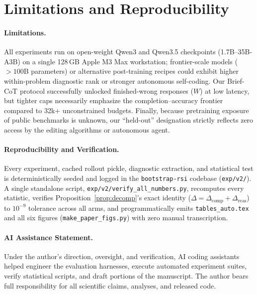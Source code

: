 \documentclass[10pt]{article}
\begin{document}
\section{Limitations and Reproducibility}
\label{sec:limitations}

\paragraph{Limitations.}
All experiments run on open-weight Qwen3 and Qwen3.5 checkpoints (1.7B--35B-A3B) on a single 128\,GB Apple M3 Max workstation; frontier-scale models ($>100$B parameters) or alternative post-training recipes could exhibit higher within-problem diagnostic rank or stronger autonomous self-coding. Our Brief-CoT protocol successfully unlocked finished-wrong responses ($W$) at low latency, but tighter caps necessarily emphasize the completion--accuracy frontier compared to 32k+ unconstrained budgets. Finally, because pretraining exposure of public benchmarks is unknown, our ``held-out'' designation strictly reflects zero access by the editing algorithms or autonomous agent.

\paragraph{Reproducibility and Verification.}
Every experiment, cached rollout pickle, diagnostic extraction, and statistical test is deterministically seeded and logged in the \texttt{bootstrap-rsi} codebase (\texttt{exp/v2/}). A single standalone script, \texttt{exp/v2/verify\_all\_numbers.py}, recomputes every statistic, verifies Proposition~\ref{prop:decomp}'s exact identity ($\Delta = \Delta_{\mathrm{comp}} + \Delta_{\mathrm{reas}}$) to $10^{-9}$ tolerance across all arms, and programmatically emits \texttt{tables\_auto.tex} and all six figures (\texttt{make\_paper\_figs.py}) with zero manual transcription.

\paragraph{AI Assistance Statement.}
Under the author's direction, oversight, and verification, AI coding assistants helped engineer the evaluation harnesses, execute automated experiment suites, verify statistical scripts, and draft portions of the manuscript. The author bears full responsibility for all scientific claims, analyses, and released code.

\clearpage


\end{document}
